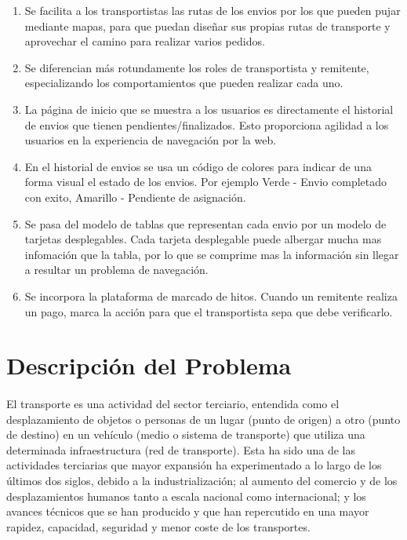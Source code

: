 \documentclass[10pt, a4paper,spanish]{article}
\begin{document}
				\begin{enumerate}
					\item Se facilita a los transportistas las rutas de los envios por los que pueden pujar mediante mapas, para que puedan diseñar sus propias rutas de transporte y aprovechar el camino para realizar varios pedidos.

					\item Se diferencian más rotundamente los roles de transportista y remitente, especializando los comportamientos que pueden realizar cada uno.

					\item La página de inicio que se muestra a los usuarios es directamente el historial de envios que tienen pendientes/finalizados. Esto proporciona agilidad a los usuarios en la experiencia de navegación por la web.

					\item En el historial de envios se usa un código de colores para indicar de una forma visual el estado de los envios. Por ejemplo Verde - Envio completado con exito, Amarillo - Pendiente de asignación.

					\item Se pasa del modelo de tablas que representan cada envio por un modelo de tarjetas desplegables. Cada tarjeta desplegable puede albergar mucha mas infomación que la tabla, por lo que se comprime mas la información sin llegar a resultar un problema de navegación.

					\item Se incorpora la plataforma de marcado de hitos. Cuando un remitente realiza un pago, marca la acción para que el transportista sepa que debe verificarlo.
				\end{enumerate}



		\section{Descripción del Problema}

			\paragraph{}
			El transporte es una actividad del sector terciario, entendida como el desplazamiento de objetos o personas de un lugar (punto de origen) a otro (punto de destino) en un vehículo (medio o sistema de transporte) que utiliza una determinada infraestructura (red de transporte). Esta ha sido una de las actividades terciarias que mayor expansión ha experimentado a lo largo de los últimos dos siglos, debido a la industrialización; al aumento del comercio y de los desplazamientos humanos tanto a escala nacional como internacional; y los avances técnicos que se han producido y que han repercutido en una mayor rapidez, capacidad, seguridad y menor coste de los transportes. \cite{wikipedia_transporte}
\end{document}
